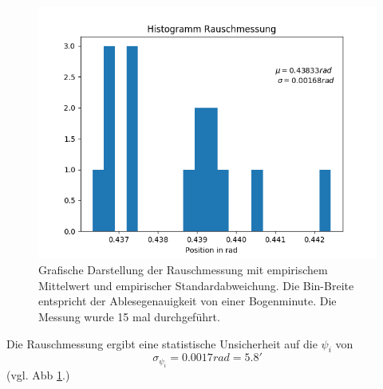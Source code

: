 \documentclass[12pt,a4paper]{article}
\begin{document}
\begin{figure}
\includegraphics[scale=1.0]{Bilder/HistRauschen.png}
\caption{Grafische Darstellung der Rauschmessung mit empirischem Mittelwert und empirischer Standardabweichung. Die Bin-Breite entspricht der Ablesegenauigkeit von einer Bogenminute. Die Messung wurde 15 mal durchgeführt.}
\label{fig:HistRauschen}
\end{figure}
	
Die Rauschmessung ergibt eine statistische Unsicherheit auf die $\psi_i$ von 
\begin{equation}
\sigma_{\psi_i} = 0.0017 rad = 5.8'
\label{eq:Rauschmessung}
\end{equation}
(vgl. Abb \ref{fig:HistRauschen}.)
	
\end{document}
